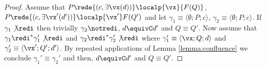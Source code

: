 \documentclass{tlp}
\begin{document}
\begin{proof}
Assume that $P\rede{(c,\exists \vx(d))}\localp{\vx}{F(Q)}$, $P\rede{(c,\exists \vx'(d'))}\localp{\vx'}F(Q')$
and let $\gamma_1\equiv\langle \emptyset;P;c \rangle$, $\gamma_2\equiv\langle \emptyset;P;c \rangle$. If $\gamma_1 \not\redi$ then trivially $\gamma_2 \notredi$, $d\equivC d'$ and $Q \equiv Q'$. 
Now assume that $\gamma_1 \redi^{*} \gamma_1' \not\redi$ and $\gamma_2 \redi^{*} 
\gamma_2'\not\redi $ where $\gamma_1' \equiv \langle \vx; Q;d\rangle$ and $\gamma_2' \equiv \langle \vx'; Q';d'\rangle$.  By   repeated applications of Lemma \ref{lemma:confluence}  we conclude $\gamma_1' \equiv \gamma_2'$ and then, $d\equivC d'$ and $Q\equiv Q'$. \end{proof}
\end{document}
